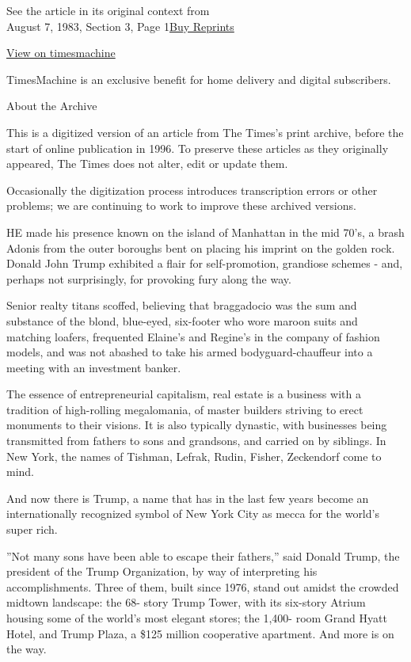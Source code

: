 See the article in its original context from\\
August 7, 1983, Section 3, Page
1\href{https://store.nytimes3xbfgragh.onion/collections/new-york-times-page-reprints?utm_source=nytimes\&utm_medium=article-page\&utm_campaign=reprints}{Buy
Reprints}

\href{http://timesmachine.nytimes3xbfgragh.onion/timesmachine/1983/08/07/086000.html}{View
on timesmachine}

TimesMachine is an exclusive benefit for home delivery and digital
subscribers.

About the Archive

This is a digitized version of an article from The Times's print
archive, before the start of online publication in 1996. To preserve
these articles as they originally appeared, The Times does not alter,
edit or update them.

Occasionally the digitization process introduces transcription errors or
other problems; we are continuing to work to improve these archived
versions.

HE made his presence known on the island of Manhattan in the mid 70's, a
brash Adonis from the outer boroughs bent on placing his imprint on the
golden rock. Donald John Trump exhibited a flair for self-promotion,
grandiose schemes - and, perhaps not surprisingly, for provoking fury
along the way.

Senior realty titans scoffed, believing that braggadocio was the sum and
substance of the blond, blue-eyed, six-footer who wore maroon suits and
matching loafers, frequented Elaine's and Regine's in the company of
fashion models, and was not abashed to take his armed
bodyguard-chauffeur into a meeting with an investment banker.

The essence of entrepreneurial capitalism, real estate is a business
with a tradition of high-rolling megalomania, of master builders
striving to erect monuments to their visions. It is also typically
dynastic, with businesses being transmitted from fathers to sons and
grandsons, and carried on by siblings. In New York, the names of
Tishman, Lefrak, Rudin, Fisher, Zeckendorf come to mind.

And now there is Trump, a name that has in the last few years become an
internationally recognized symbol of New York City as mecca for the
world's super rich.

''Not many sons have been able to escape their fathers,'' said Donald
Trump, the president of the Trump Organization, by way of interpreting
his accomplishments. Three of them, built since 1976, stand out amidst
the crowded midtown landscape: the 68- story Trump Tower, with its
six-story Atrium housing some of the world's most elegant stores; the
1,400- room Grand Hyatt Hotel, and Trump Plaza, a \$125 million
cooperative apartment. And more is on the way.


